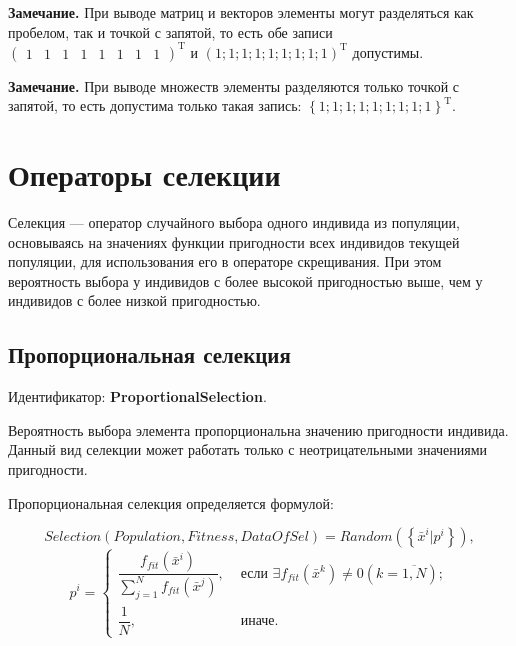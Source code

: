 \documentclass[a4paper,12pt]{article}
\begin{document}
\textbf{Замечание.} При выводе матриц и векторов элементы могут разделяться как пробелом, так и точкой с запятой, то есть обе записи $ {\left(\begin{array}{cccccccc}
 1&1&1&1&1&1&1&1
\end{array} \right)}^\mathrm{T} $ и $ {\left(1;1;1;1;1;1;1;1;1 \right)}^\mathrm{T} $ допустимы.

\textbf{Замечание.} При выводе множеств элементы разделяются только точкой с запятой, то есть допустима только такая запись: $ {\left\lbrace 1;1;1;1;1;1;1;1;1 \right\rbrace }^\mathrm{T} $.

\section{Операторы селекции}\label{SetOfOperatorsAlgorithms:section_selection}

Селекция --- оператор случайного выбора одного индивида из популяции, основываясь на значениях функции пригодности всех индивидов текущей популяции, для использования его в операторе скрещивания. При этом вероятность выбора у индивидов с более высокой пригодностью выше, чем у индивидов с более низкой пригодностью.

\subsection{Пропорциональная селекция}\label{SetOfOperatorsAlgorithms:ProportionalSelection}

Идентификатор: \textbf{ProportionalSelection}.

Вероятность выбора элемента пропорциональна значению пригодности индивида. Данный вид селекции может работать только с неотрицательными значениями пригодности.

Пропорциональная селекция определяется формулой:

\begin{equation}
\label{SetOfOperatorsAlgorithms:eq:ProportionalSelection}
Selection\left( Population, Fitness, DataOfSel\right) = Random\left( \left\lbrace\bar{x}^i | p^i \right\rbrace \right),
\end{equation}
\begin{equation}
p^i=\left\lbrace \begin{aligned}
\dfrac{f_{fit}\left( \bar{x}^i\right) }{\sum_{j=1}^N{f_{fit}\left( \bar{x}^j\right)}},&\text { если }  \exists f_{fit}\left( \bar{x}^k\right)\neq 0 \left( k=\overline{1,N} \right); \\ \dfrac{1}{N} ,&\text { иначе}.
\end{aligned}\right.
\end{equation}
\end{document}
